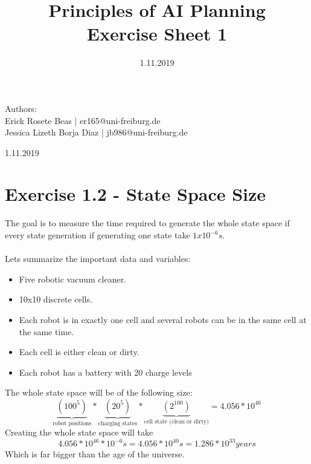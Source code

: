 \documentclass[12pt,a4paper]{article}
\title{\textbf{Principles of AI Planning
\\{\Large Exercise Sheet 1}}}
\date{1.11.2019}
\begin{document}
	\begin{flushleft}
		Authors:\\
		Erick Rosete Beas | er165@uni-freiburg.de\\
		Jessica Lizeth Borja Diaz | jb986@uni-freiburg.de\\
	\end{flushleft}
	{\let\newpage\relax\maketitle}
	\begin{center} 
		\large 1.11.2019 
	\end{center}
	
	\section*{Exercise 1.2 - State Space Size}
	The goal is to measure the time required to generate the whole state space if every state generation if generating one state
	take $1x10^{-6} s$.\\\\
	Lets summarize the important data and variables:
	\begin{itemize}[noitemsep]
		\item Five robotic vacuum cleaner.
		\item 10x10 discrete cells.
		\item Each robot is in exactly one cell and several robots can be in the same cell at the same time.
		\item Each cell is either clean or dirty.
		\item Each robot has a battery with 20 charge levels
	\end{itemize}
	The whole state space will be of the following size:
	\[
		\underbrace{(100^{5})}_{\text{robot positions}}*
		\underbrace{(20^{5})}_{\text{charging states}}*
		\underbrace{(2^{100})}_{\text{cell state (clean or dirty)}} = 4.056*10^{46}
	\]
	Creating the whole state space will take
	\[4.056*10^{46}*10^{-6}s = 4.056*10^{40} s = 1.286*10^{33} years\]
	Which is far bigger than the age of the universe.
	
\end{document}
